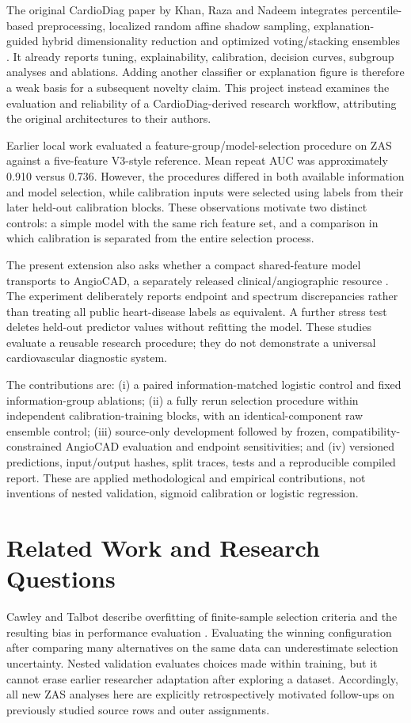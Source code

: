 \documentclass[conference]{IEEEtran}
\begin{document}
The original CardioDiag paper by Khan, Raza and Nadeem integrates percentile-based preprocessing, localized random affine shadow sampling, explanation-guided hybrid dimensionality reduction and optimized voting/stacking ensembles \cite{r1}. It already reports tuning, explainability, calibration, decision curves, subgroup analyses and ablations. Adding another classifier or explanation figure is therefore a weak basis for a subsequent novelty claim. This project instead examines the evaluation and reliability of a CardioDiag-derived research workflow, attributing the original architectures to their authors.

Earlier local work evaluated a feature-group/model-selection procedure on ZAS against a five-feature V3-style reference. Mean repeat AUC was approximately 0.910 versus 0.736. However, the procedures differed in both available information and model selection, while calibration inputs were selected using labels from their later held-out calibration blocks. These observations motivate two distinct controls: a simple model with the same rich feature set, and a comparison in which calibration is separated from the entire selection process.

The present extension also asks whether a compact shared-feature model transports to AngioCAD, a separately released clinical/angiographic resource \cite{r4}. The experiment deliberately reports endpoint and spectrum discrepancies rather than treating all public heart-disease labels as equivalent. A further stress test deletes held-out predictor values without refitting the model. These studies evaluate a reusable research procedure; they do not demonstrate a universal cardiovascular diagnostic system.

The contributions are: (i) a paired information-matched logistic control and fixed information-group ablations; (ii) a fully rerun selection procedure within independent calibration-training blocks, with an identical-component raw ensemble control; (iii) source-only development followed by frozen, compatibility-constrained AngioCAD evaluation and endpoint sensitivities; and (iv) versioned predictions, input/output hashes, split traces, tests and a reproducible compiled report. These are applied methodological and empirical contributions, not inventions of nested validation, sigmoid calibration or logistic regression.

\section{Related Work and Research Questions}
Cawley and Talbot describe overfitting of finite-sample selection criteria and the resulting bias in performance evaluation \cite{r2}. Evaluating the winning configuration after comparing many alternatives on the same data can underestimate selection uncertainty. Nested validation evaluates choices made within training, but it cannot erase earlier researcher adaptation after exploring a dataset. Accordingly, all new ZAS analyses here are explicitly retrospectively motivated follow-ups on previously studied source rows and outer assignments.
\end{document}
